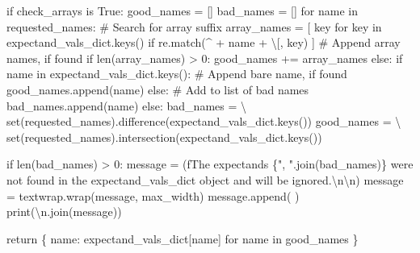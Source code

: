\documentclass[
  letterpaper,
  DIV=11,
  numbers=noendperiod]{scrartcl}
\newenvironment{Shaded}{\begin{snugshade}}{\end{snugshade}}
\newcommand{\BuiltInTok}[1]{\textcolor[rgb]{0.00,0.23,0.31}{#1}}
\newcommand{\CharTok}[1]{\textcolor[rgb]{0.13,0.47,0.30}{#1}}
\newcommand{\CommentTok}[1]{\textcolor[rgb]{0.37,0.37,0.37}{#1}}
\newcommand{\ControlFlowTok}[1]{\textcolor[rgb]{0.00,0.23,0.31}{#1}}
\newcommand{\DecValTok}[1]{\textcolor[rgb]{0.68,0.00,0.00}{#1}}
\newcommand{\KeywordTok}[1]{\textcolor[rgb]{0.00,0.23,0.31}{#1}}
\newcommand{\NormalTok}[1]{\textcolor[rgb]{0.00,0.23,0.31}{#1}}
\newcommand{\OperatorTok}[1]{\textcolor[rgb]{0.37,0.37,0.37}{#1}}
\newcommand{\SpecialCharTok}[1]{\textcolor[rgb]{0.37,0.37,0.37}{#1}}
\newcommand{\SpecialStringTok}[1]{\textcolor[rgb]{0.13,0.47,0.30}{#1}}
\newcommand{\StringTok}[1]{\textcolor[rgb]{0.13,0.47,0.30}{#1}}
\newcommand{\VariableTok}[1]{\textcolor[rgb]{0.07,0.07,0.07}{#1}}
\begin{document}
\begin{Shaded}
\begin{Highlighting}[]
  \ControlFlowTok{if}\NormalTok{ check\_arrays }\KeywordTok{is} \VariableTok{True}\NormalTok{:}
\NormalTok{    good\_names }\OperatorTok{=}\NormalTok{ []}
\NormalTok{    bad\_names }\OperatorTok{=}\NormalTok{ []}
    \ControlFlowTok{for}\NormalTok{ name }\KeywordTok{in}\NormalTok{ requested\_names:}
      \CommentTok{\# Search for array suffix}
\NormalTok{      array\_names }\OperatorTok{=}\NormalTok{ [ key }\ControlFlowTok{for}\NormalTok{ key }\KeywordTok{in}\NormalTok{ expectand\_vals\_dict.keys()}
                      \ControlFlowTok{if}\NormalTok{ re.match(}\StringTok{\textquotesingle{}\^{}\textquotesingle{}} \OperatorTok{+}\NormalTok{ name }\OperatorTok{+} \StringTok{\textquotesingle{}\textbackslash{}[\textquotesingle{}}\NormalTok{, key) ]}
      \CommentTok{\# Append array names, if found}
      \ControlFlowTok{if} \BuiltInTok{len}\NormalTok{(array\_names) }\OperatorTok{\textgreater{}} \DecValTok{0}\NormalTok{:}
\NormalTok{        good\_names }\OperatorTok{+=}\NormalTok{ array\_names}
      \ControlFlowTok{else}\NormalTok{:}
        \ControlFlowTok{if}\NormalTok{ name }\KeywordTok{in}\NormalTok{ expectand\_vals\_dict.keys():}
          \CommentTok{\# Append bare name, if found}
\NormalTok{          good\_names.append(name)}
        \ControlFlowTok{else}\NormalTok{:}
          \CommentTok{\# Add to list of bad names}
\NormalTok{          bad\_names.append(name)}
  \ControlFlowTok{else}\NormalTok{:}
\NormalTok{    bad\_names }\OperatorTok{=} \OperatorTok{\textbackslash{}}
      \BuiltInTok{set}\NormalTok{(requested\_names).difference(expectand\_vals\_dict.keys())}
\NormalTok{    good\_names }\OperatorTok{=} \OperatorTok{\textbackslash{}}
      \BuiltInTok{set}\NormalTok{(requested\_names).intersection(expectand\_vals\_dict.keys())}
    
  \ControlFlowTok{if} \BuiltInTok{len}\NormalTok{(bad\_names) }\OperatorTok{\textgreater{}} \DecValTok{0}\NormalTok{:}
\NormalTok{    message }\OperatorTok{=}\NormalTok{ (}\SpecialStringTok{f\textquotesingle{}The expectands }\SpecialCharTok{\{}\StringTok{", "}\SpecialCharTok{.}\NormalTok{join(bad\_names)}\SpecialCharTok{\}}\SpecialStringTok{ \textquotesingle{}}
               \StringTok{\textquotesingle{}were not found in the \textasciigrave{}expectand\_vals\_dict\textasciigrave{} \textquotesingle{}}
               \StringTok{\textquotesingle{}object and will be ignored.}\CharTok{\textbackslash{}n\textbackslash{}n}\StringTok{\textquotesingle{}}\NormalTok{)}
\NormalTok{    message }\OperatorTok{=}\NormalTok{ textwrap.wrap(message, max\_width)}
\NormalTok{    message.append(}\StringTok{\textquotesingle{} \textquotesingle{}}\NormalTok{)}
    \BuiltInTok{print}\NormalTok{(}\StringTok{\textquotesingle{}}\CharTok{\textbackslash{}n}\StringTok{\textquotesingle{}}\NormalTok{.join(message))}
  
  \ControlFlowTok{return}\NormalTok{ \{ name: expectand\_vals\_dict[name] }\ControlFlowTok{for}\NormalTok{ name }\KeywordTok{in}\NormalTok{ good\_names \}}
\end{Highlighting}
\end{Shaded}
\end{document}
